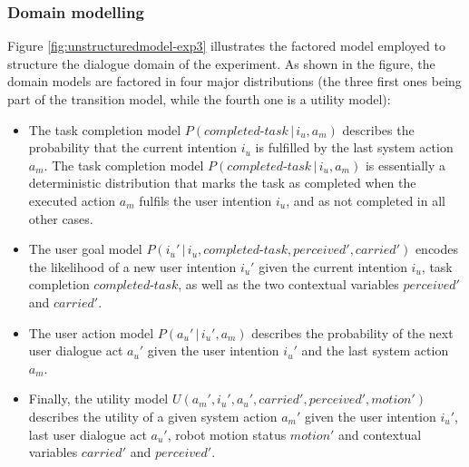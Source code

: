 \subsubsection*{Domain modelling}

Figure \ref{fig:unstructuredmodel-exp3} illustrates the factored model employed to structure the dialogue domain of the experiment.  As shown in the figure, the domain models are factored in four major distributions (the three first ones being part of the transition model, while the fourth one is a utility model): 
\begin{itemize}
\item The task completion model $P(\mathit{completed\mbox{-}task}\, | \, i_u, a_m)$ describes the probability that the current intention $i_u$ is fulfilled by the last system action $a_m$.  The task completion model $P(\mathit{completed\mbox{-}task}\, | \, i_u, a_m)$ is essentially a deterministic distribution that marks the task as completed when the executed action $a_m$ fulfils the user intention $i_u$,  and as not completed in all other cases. %
\item The user goal model $P(i_u' \, | \, i_u, \mathit{completed\mbox{-}task}, \mathit{perceived'}, \mathit{carried'})$ encodes the likelihood of a new user intention $i_u'$ given the current intention $i_u$, task completion $\mathit{completed\mbox{-}task}$, as well as the two contextual variables $\mathit{perceived}'$ and $\mathit{carried}'$. 
\item The user action model $P(a_u'\, | \, i_u', a_m)$ describes the probability of the next user dialogue act $a_u'$ given the user intention $i_u'$ and the last system action $a_m$.
\item Finally, the utility model $U(a_m', i_u', a_u', \mathit{carried'}, \mathit{perceived'}, \mathit{motion'})$ describes the utility of a given system action $a_m'$ given the user intention $i_u'$, last user dialogue act $a_u'$, robot motion status $\mathit{motion'}$ and contextual variables $\mathit{carried}'$ and $\mathit{perceived}'$. 
\end{itemize}

